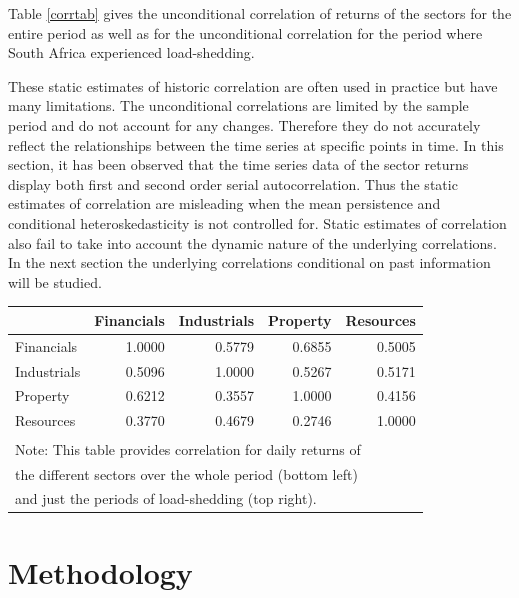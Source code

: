 \documentclass[11pt,preprint, authoryear]{elsarticle}
\let\origtable\table
\let\endorigtable\endtable
\renewenvironment{table}[1][2] {
    \expandafter\origtable\expandafter[H]
} {
    \endorigtable
}
\numberwithin{equation}{section}
\numberwithin{figure}{section}
\numberwithin{table}{section}
\begin{document}
Table \ref{corrtab} gives the unconditional correlation of returns of
the sectors for the entire period as well as for the unconditional
correlation for the period where South Africa experienced load-shedding.

These static estimates of historic correlation are often used in
practice but have many limitations. The unconditional correlations are
limited by the sample period and do not account for any changes.
Therefore they do not accurately reflect the relationships between the
time series at specific points in time. In this section, it has been
observed that the time series data of the sector returns display both
first and second order serial autocorrelation. Thus the static estimates
of correlation are misleading when the mean persistence and conditional
heteroskedasticity is not controlled for. Static estimates of
correlation also fail to take into account the dynamic nature of the
underlying correlations. In the next section the underlying correlations
conditional on past information will be studied.

\begin{table}

\caption{\label{tab:corrtab}Static Unconditional Correlation \label{corrtab}}
\centering
\fontsize{9}{11}\selectfont
\begin{tabular}[t]{l|r|r|r|r}
\hline
  & Financials & Industrials & Property & Resources\\
\hline
Financials & 1.0000 & 0.5779 & 0.6855 & 0.5005\\
\hline
Industrials & 0.5096 & 1.0000 & 0.5267 & 0.5171\\
\hline
Property & 0.6212 & 0.3557 & 1.0000 & 0.4156\\
\hline
Resources & 0.3770 & 0.4679 & 0.2746 & 1.0000\\
\hline
\multicolumn{5}{l}{\textsuperscript{} Note: This table provides correlation for daily returns of}\\
\multicolumn{5}{l}{the different sectors over the whole period (bottom left)}\\
\multicolumn{5}{l}{and just the periods of load-shedding (top right).}\\
\end{tabular}
\end{table}

\hypertarget{methodology}{%
\section{\texorpdfstring{Methodology
\label{Meth}}{Methodology }}\label{methodology}}
\end{document}
